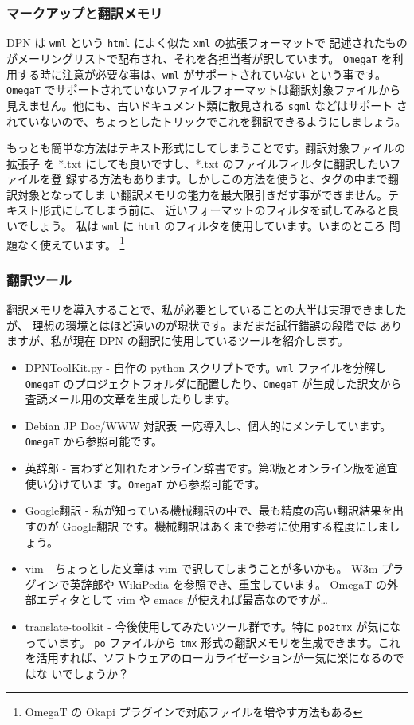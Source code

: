 \documentclass[mingoth,a4paper]{jsarticle}
\begin{document}
\subsubsection{マークアップと翻訳メモリ}
DPN は {\tt wml} という {\tt html} によく似た {\tt xml} の拡張フォーマットで
記述されたものがメーリングリストで配布され、それを各担当者が訳しています。
{\tt OmegaT} を利用する時に注意が必要な事は、{\tt wml} がサポートされていない
という事です。
{\tt OmegaT} でサポートされていないファイルフォーマットは翻訳対象ファイルから
見えません。他にも、古いドキュメント類に散見される {\tt sgml} などはサポート
されていないので、ちょっとしたトリックでこれを翻訳できるようにしましょう。

もっとも簡単な方法はテキスト形式にしてしまうことです。翻訳対象ファイルの拡張子
を *.txt にしても良いですし、*.txt のファイルフィルタに翻訳したいファイルを登
録する方法もあります。しかしこの方法を使うと、タグの中まで翻訳対象となってしま
い翻訳メモリの能力を最大限引きだす事ができません。テキスト形式にしてしまう前に、
近いフォーマットのフィルタを試してみると良いでしょう。
私は {\tt wml} に {\tt html} のフィルタを使用しています。いまのところ
問題なく使えています。
\footnote{OmegaT の Okapi プラグインで対応ファイルを増やす方法もある}

\subsubsection{翻訳ツール}
翻訳メモリを導入することで、私が必要としていることの大半は実現できましたが、
理想の環境とはほど遠いのが現状です。まだまだ試行錯誤の段階では
ありますが、私が現在 DPN の翻訳に使用しているツールを紹介します。

\begin{itemize}
\item DPNToolKit.py -
	自作の python スクリプトです。{\tt wml} ファイルを分解し {\tt OmegaT}
	 のプロジェクトフォルダに配置したり、{\tt OmegaT} が生成した訳文から
	査読メール用の文章を生成したりします。
\item Debian JP Doc/WWW 対訳表
    一応導入し、個人的にメンテしています。{\tt OmegaT} から参照可能です。
\item 英辞郎 -
    言わずと知れたオンライン辞書です。第3版とオンライン版を適宜使い分けていま
    す。{\tt OmegaT} から参照可能です。
\item Google翻訳 -
    私が知っている機械翻訳の中で、最も精度の高い翻訳結果を出すのが Google翻訳
    です。機械翻訳はあくまで参考に使用する程度にしましょう。
\item vim -
    ちょっとした文章は vim で訳してしまうことが多いかも。
    W3m プラグインで英辞郎や WikiPedia を参照でき、重宝しています。
    OmegaT の外部エディタとして vim や emacs が使えれば最高なのですが…
\item translate-toolkit -
    今後使用してみたいツール群です。特に {\tt po2tmx} が気になっています。
    {\tt po} ファイルから {\tt tmx} 形式の翻訳メモリを生成できます。これ
    を活用すれば、ソフトウェアのローカライゼーションが一気に楽になるのではな
    いでしょうか？
\end{itemize}
\end{document}
